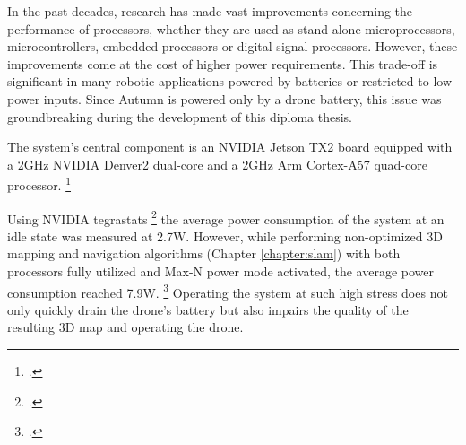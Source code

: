 In the past decades, research has made vast improvements concerning the performance of processors, whether they are used as stand-alone microprocessors, microcontrollers, embedded processors or digital signal processors. However, these improvements come at the cost of higher power requirements. This trade-off is significant in many robotic applications powered by batteries or restricted to low power inputs. Since Autumn is powered only by a drone battery, this issue was groundbreaking during the development of this diploma thesis. 

The system's central component is an NVIDIA Jetson TX2 board equipped with a 2GHz NVIDIA Denver2 dual-core and a 2GHz Arm Cortex-A57 quad-core processor. \footcite{jetsonHardwarePageNoDate}

Using NVIDIA tegrastats \footcite{nvidiaTegrastatsNoDate} the average power consumption of the system at an idle state was measured at 2.7W. However, while performing non-optimized 3D mapping and navigation algorithms (Chapter \ref{chapter:slam}) with both processors fully utilized and Max-N power mode activated, the average power consumption reached 7.9W. \footcite{jetsonPowerModesNoDate} 
Operating the system at such high stress does not only quickly drain the drone's battery but also impairs the quality of the resulting 3D map and operating the drone.


